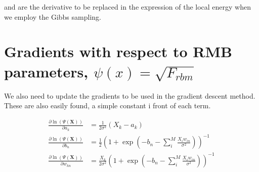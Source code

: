 and are the derivative to be replaced in the expression of the local energy when we employ the Gibbs sampling.

\section{Gradients with respect to RMB parameters, $\psi(x) = \sqrt{F_{rbm}}$}

We also need to update the gradients to be used in the gradient descent method. These are also easily found, a simple constant i front of each term.


\begin{align}
\frac{\partial \ln( \Psi(\mathbf{X}) )}{\partial a_k} &= \frac{1}{2 \sigma ^2} (X_k - a_k)\\
\frac{\partial \ln( \Psi(\mathbf{X}) )}{\partial b_n} &= \frac{1}{2}\left(1 +  \exp\left(- b_n  - \sum_i^M \frac{X_i w_{in}}{\sigma^2}\right)  \right)^{-1}  \\
\frac{\partial \ln( \Psi(\mathbf{X}) )}{\partial w_{kn}}& = \frac{X_k}{2 \sigma^2} \left(1 +  \exp\left(- b_n  - \sum_i^M \frac{X_i w_{in}}{\sigma^2}\right)  \right)^{-1}   
\end{align}

